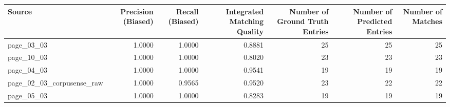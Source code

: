 \begin{tabular}{lrrrrrr}
\toprule
Source & Precision (Biased) & Recall (Biased) & Integrated Matching Quality & Number of Ground Truth Entries & Number of Predicted Entries & Number of Matches \\
\midrule
page\_03\_03 & 1.0000 & 1.0000 & 0.8881 & 25 & 25 & 25 \\
page\_10\_03 & 1.0000 & 1.0000 & 0.8020 & 23 & 23 & 23 \\
page\_04\_03 & 1.0000 & 1.0000 & 0.9541 & 19 & 19 & 19 \\
page\_02\_03\_corpusense\_raw & 1.0000 & 0.9565 & 0.9520 & 23 & 22 & 22 \\
page\_05\_03 & 1.0000 & 1.0000 & 0.8283 & 19 & 19 & 19 \\
\bottomrule
\end{tabular}
